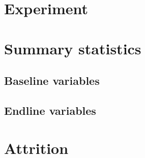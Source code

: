 \documentclass[10pt]{article}
\begin{document}
\section{Experiment}

	\clearpage

\section{Summary statistics}

	\subsection{Baseline variables}

		
		
		
		
		

	\clearpage

	\subsection{Endline variables}

		
		
		\begin{landscape}  \end{landscape}
		\begin{landscape}  \end{landscape}
		\begin{landscape}  \end{landscape}
		\begin{landscape}  \end{landscape}

	\clearpage

\section{Attrition}

	

	
	
	
	
	

	
	
	
	
\end{document}
